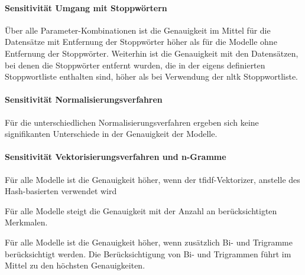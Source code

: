 \paragraph{Sensitivität Umgang mit Stoppwörtern}

Über alle Parameter-Kombinationen ist die Genauigkeit im Mittel für die Datensätze mit Entfernung der Stoppwörter höher als für die Modelle ohne Entfernung der Stoppwörter.
Weiterhin ist die Genauigkeit mit den Datensätzen, bei denen die Stoppwörter entfernt wurden, die in der eigens definierten Stoppwortliste enthalten sind, höher als bei Verwendung der \gls{nltk} Stoppwortliste.

\paragraph{Sensitivität Normalisierungsverfahren}

Für die unterschiedlichen Normalisierungsverfahren ergeben sich keine signifikanten Unterschiede in der Genauigkeit der Modelle.

\paragraph{Sensitivität Vektorisierungsverfahren und n-Gramme}

Für alle Modelle ist die Genauigkeit höher, wenn der \gls{tfidf}-Vektorizer, anstelle des Hash-basierten verwendet wird

Für alle Modelle steigt die Genauigkeit mit der Anzahl an berücksichtigten Merkmalen.

Für alle Modelle ist die Genauigkeit höher, wenn zusätzlich Bi- und Trigramme berücksichtigt werden.
Die Berücksichtigung von Bi- und Trigrammen führt im Mittel zu den höchsten Genauigkeiten.
